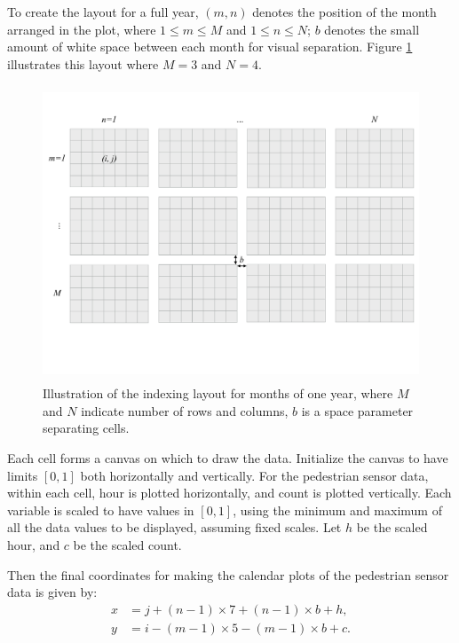 \documentclass[12pt]{article}
\begin{document}
To create the layout for a full year, \((m, n)\) denotes the position of the month arranged in the plot, where \(1 \le m \le M\) and \(1 \le n \le N\); \(b\) denotes the small amount of white space between each month for visual separation. Figure \ref{fig:year-diagram} illustrates this layout where \(M = 3\) and \(N = 4\).

\begin{figure}

{\centering \includegraphics[width=360pt,height=250pt]{img/year-diagram} 

}

\caption{Illustration of the indexing layout for months of one year, where \(M\) and \(N\) indicate number of rows and columns, \(b\) is a space parameter separating cells.}\label{fig:year-diagram}
\end{figure}



Each cell forms a canvas on which to draw the data. Initialize the canvas to have limits \([0, 1]\) both horizontally and vertically. For the pedestrian sensor data, within each cell, hour is plotted horizontally, and count is plotted vertically. Each variable is scaled to have values in \([0, 1]\), using the minimum and maximum of all the data values to be displayed, assuming fixed scales. Let \(h\) be the scaled hour, and \(c\) be the scaled count.

Then the final coordinates for making the calendar plots of the pedestrian sensor data is given by:
\begin{equation}
  \begin{aligned}
  x &= j + (n - 1) \times 7 + (n - 1) \times b + h, \\
  y &= i - (m - 1) \times 5 - (m - 1) \times b + c.
  \end{aligned}
  \label{eq:final}
\end{equation}
\end{document}
